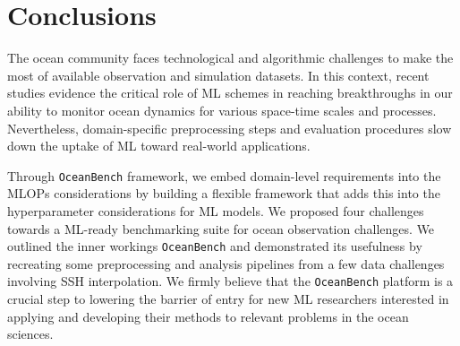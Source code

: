 \section{Conclusions} \label{sec:conclusions}

The ocean community faces technological and algorithmic challenges to make the most of available observation and simulation datasets. 
In this context, recent studies evidence the critical role of ML schemes in reaching breakthroughs in our ability to monitor ocean dynamics for various space-time scales and processes. 
Nevertheless, domain-specific preprocessing steps and evaluation procedures slow down the uptake of ML toward real-world applications.

Through \texttt{OceanBench} framework, we embed domain-level requirements into the MLOPs considerations by building a flexible framework that adds this into the hyperparameter considerations for ML models. 
We proposed four challenges towards a ML-ready benchmarking suite for ocean observation challenges. 
We outlined the inner workings \texttt{OceanBench} and demonstrated its usefulness by recreating some preprocessing and analysis pipelines from a few data challenges involving SSH interpolation.
We firmly believe that the \texttt{OceanBench} platform is a crucial step to lowering the barrier of entry for new ML researchers interested in applying and developing their methods to relevant problems in the ocean sciences.

